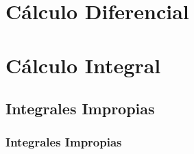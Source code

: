 \documentclass[12pt, fleqn]{report}                             %
\theoremstyle{break}                                            %
\begin{document}
                    











\part{Cálculo Diferencial}
















\part{Cálculo Integral}

    \chapter{Integrales Impropias}
        \clearpage

        \section{Integrales Impropias}
\end{document}

